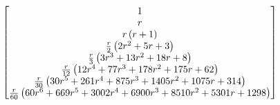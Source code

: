 \begin{displaymath}
\hspace{-1.5cm}
\left[\begin{matrix}1 \\r \\r \left(r + 1\right) \\\frac{r}{2} \left(2 r^{2} + 5 r + 3\right) \\\frac{r}{3} \left(3 r^{3} + 13 r^{2} + 18 r + 8\right) \\\frac{r}{12} \left(12 r^{4} + 77 r^{3} + 178 r^{2} + 175 r + 62\right) \\\frac{r}{30} \left(30 r^{5} + 261 r^{4} + 875 r^{3} + 1405 r^{2} + 1075 r + 314\right) \\\frac{r}{60} \left(60 r^{6} + 669 r^{5} + 3002 r^{4} + 6900 r^{3} + 8510 r^{2} + 5301 r + 1298\right) \end{matrix}\right]
\end{displaymath}

